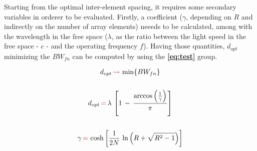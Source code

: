 \documentclass[12pt,a4paper,twocolumn]{article}
\begin{document}
{\indent 

Starting from the optimal inter-element spacing, it requires some secondary variables in orderer to be evaluated. Firstly, a coefficient ($\gamma$, depending on $R$ and indirectly on the number of array elements) neeeds to be calculated, among with the wavelength in the free space ($\lambda$, as the ratio between the light speed in the free space - $c$ - and the operating frequency $f$). Having those quantities, $d_{opt}$ minimizing the $BW_{fn}$ can be computed by using the \textbf{\cref{eq:test}} group. 

{\begin{equation}
		\begin{gathered}
			d_{opt}\,{\color{Mahogany}\leadsto}\,\min\{BW_{fn}\}\\
			\\
			d_{opt}\,{\color{Mahogany}=}\,\lambda\,\left[1\,-\,\frac{\arccos\left(\frac{1}{\gamma}\right)}{\pi}\right]\\
			\\
			\gamma\,{\color{Mahogany}=}\,\cosh\left[\frac{1}{2N}\,\ln\left(R+\sqrt{R^2-1}\right)\right]
		\end{gathered}
		\label{eq:test}
	\end{equation}
}


}
\end{document}
